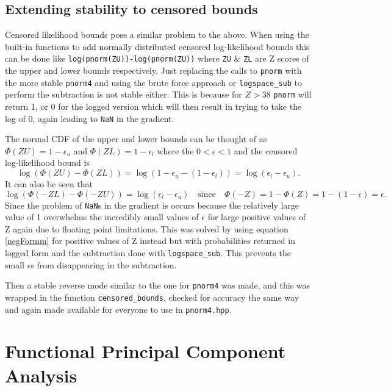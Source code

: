 \documentclass[11pt]{article}\usepackage[]{graphicx}\usepackage[]{color}
\begin{document}
\begin{appendices}
  \subsection{Extending stability to censored bounds} 	\label{astable2}
  Censored likelihood bounds pose a similar problem to the above. When using the built-in functions to add normally distributed censored log-likelihood bounds this can be done like \texttt{log(pnorm(ZU))-log(pnorm(ZU))} where \texttt{ZU} \& \texttt{ZL} are Z scores of the upper and lower bounds respectively. Just replacing the calls to \texttt{pnorm} with the more stable \texttt{pnorm4} and using the brute force approach or \texttt{logspace\_sub} to perform the subtraction is not stable either. This is because for $Z > 38$ \texttt{pnorm} will return 1, or 0 for the logged version which will then result in trying to take the log of 0, again leading to \texttt{NaN} in the gradient.

  The normal CDF of the upper and lower bounds can be thought of as $\Phi(ZU)=1-\epsilon_u$ and $\Phi(ZL)=1-\epsilon_l$ where the $0 < \epsilon < 1$ and the censored log-likelihood bound is 
  \begin{equation}
    \log(\Phi(ZU)-\Phi(ZL)) = \log(1-\epsilon_u-(1-\epsilon_l)) = \log(\epsilon_l-\epsilon_u). 
  \end{equation}
  It can also be seen that 
  \begin{equation}\label{negFormm}
    \log(\Phi(-ZL)-\Phi(-ZU)) = \log(\epsilon_l-\epsilon_u) \quad \text{since} \quad \Phi(-Z) = 1-\Phi(Z) = 1-(1-\epsilon) = \epsilon.
  \end{equation}
  Since the problem of \texttt{NaN}s in the gradient is occurs because the relatively large value of 1 overwhelms the incredibly small values of $\epsilon$ for large positive values of Z again due to floating point limitations. This was solved by using equation \ref{negFormm} for positive values of Z instead but with probabilities returned in logged form and the subtraction done with \texttt{logspace\_sub}. This prevents the small $\epsilon$s from disappearing in the subtraction.   

  Then a stable reverse mode similar to the one for \texttt{pnorm4} was made, and this was wrapped in the function \texttt{censored\_bounds}, checked for accuracy the same way and again made available for everyone to use in \texttt{pnorm4.hpp}. 

  \section{Functional Principal Component Analysis}\label{afpca}


\end{appendices}
\end{document}
